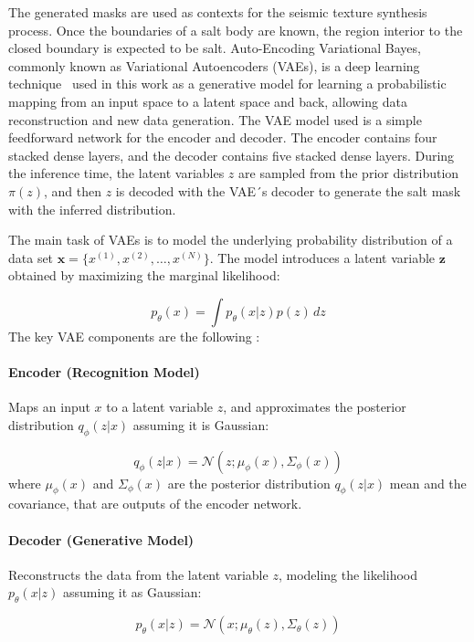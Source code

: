 \documentclass{ieeeaccess}
\begin{document}
The generated masks are used as contexts for the seismic texture synthesis process. Once the boundaries of a salt body are known, the region interior to the closed boundary is expected to be salt. Auto-Encoding Variational Bayes, commonly known as Variational Autoencoders (VAEs), is a deep learning technique~\cite{ref8} used in this work as a generative model for learning a probabilistic mapping from an input space to a latent space and back, allowing data reconstruction and new data generation. The VAE model used is a simple feedforward network for the encoder and decoder. The encoder contains four stacked dense layers, and the decoder contains five stacked dense layers. During the inference time, the latent variables $z$ are sampled from the prior distribution $\pi(z)$, and then $z$ is decoded with the VAE´s decoder to generate the salt mask with the inferred distribution.

The main task of VAEs is to model the underlying probability distribution of a data set $\bm{x} = \{x^{(1)}, x^{(2)}, \ldots, x^{(N)}\}$. The model introduces a latent variable $\bm{z}$ obtained by maximizing the marginal likelihood:

\begin{equation}
p_\theta(x) = \int p_\theta(x | z) p(z) \, dz
\end{equation}
The key VAE components are the following :

\paragraph{Encoder (Recognition Model)}
Maps an input $x$ to a latent variable $z$, and approximates the posterior distribution $q_\phi(z | x)$ assuming it is Gaussian:

\begin{equation}
q_\phi(z | x) = \mathcal{N}(z; \mu_\phi(x), \Sigma_\phi(x))
\end{equation}
where $\mu_\phi(x)$ and $\Sigma_\phi(x)$ are the posterior distribution $q_\phi(z | x)$ mean and the covariance, that are outputs of the encoder network.

\paragraph{Decoder (Generative Model)}
Reconstructs the data from the latent variable $z$, modeling the likelihood $p_\theta(x | z)$ assuming it as Gaussian:

\begin{equation}
p_\theta(x | z) = \mathcal{N}(x; \mu_\theta(z), \Sigma_\theta(z))
\end{equation}
\end{document}
